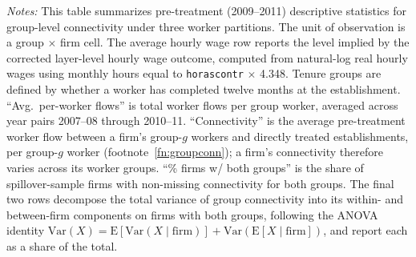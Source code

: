 \documentclass[11pt]{article}
\begin{document}
\begin{table}[H]
\begin{minipage}{\linewidth}
\textit{Notes:} This table summarizes pre-treatment (2009--2011) descriptive statistics for group-level connectivity under three worker partitions. The unit of observation is a group $\times$ firm cell. The average hourly wage row reports the level implied by the corrected layer-level hourly wage outcome, computed from natural-log real hourly wages using monthly hours equal to \texttt{horascontr} $\times$ 4.348. Tenure groups are defined by whether a worker has completed twelve months at the establishment. ``Avg.\ per-worker flows'' is total worker flows per group worker, averaged across year pairs 2007--08 through 2010--11. ``Connectivity'' is the average pre-treatment worker flow between a firm's group-$g$ workers and directly treated establishments, per group-$g$ worker (footnote~\ref{fn:groupconn}); a firm's connectivity therefore varies across its worker groups. ``\% firms w/ both groups'' is the share of spillover-sample firms with non-missing connectivity for both groups. The final two rows decompose the total variance of group connectivity into its within- and between-firm components on firms with both groups, following the ANOVA identity $\mathrm{Var}(X) = \mathrm{E}[\mathrm{Var}(X \mid \mathrm{firm})] + \mathrm{Var}(\mathrm{E}[X \mid \mathrm{firm}])$, and report each as a share of the total.
\end{minipage}
\end{table}
\end{document}
